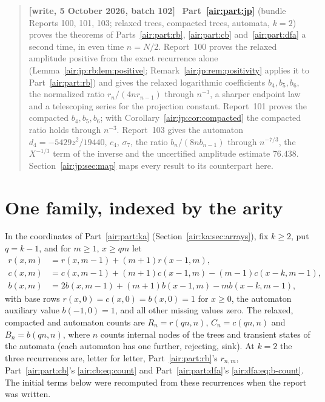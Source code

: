 \documentclass[11pt,letterpaper]{article}
\numberwithin{equation}{section}
\theoremstyle{remark}
\newenvironment{writenotejp}{\par\smallskip\begin{quote}\small\textbf{[write, 5 October 2026, batch 102]}\ }{\end{quote}\smallskip}
\begin{document}
\begin{writenotejp}
\textbf{Part~\ref{air:part:jp}} (bundle Reports 100, 101, 103; relaxed trees, compacted trees, automata, $k=2$) proves the theorems of Parts~\ref{air:part:rb}, \ref{air:part:cb} and~\ref{air:part:dfa} a second time, in even time $n=N/2$. Report~100 proves the relaxed amplitude positive from the exact recurrence alone (Lemma~\ref{air:jp:rb:lem:positive}; Remark~\ref{air:jp:rem:positivity} applies it to Part~\ref{air:part:rb}) and gives the relaxed logarithmic coefficients $b_4,b_5,b_6$, the normalized ratio $r_n/(4nr_{n-1})$ through $n^{-3}$, a sharper endpoint law and a telescoping series for the projection constant. Report~101 proves the compacted $b_4,b_5,b_6$; with Corollary~\ref{air:jp:cor:compacted} the compacted ratio holds through $n^{-3}$. Report~103 gives the automaton $d_4=-5429z^2/19440$, $c_4$, $\sigma_7$, the ratio $b_n/(8nb_{n-1})$ through $n^{-7/3}$, the $X^{-1/3}$ term of the inverse and the uncertified amplitude estimate $76.438$. Section~\ref{air:jp:sec:map} maps every result to its counterpart here.
\end{writenotejp}

\section*{One family, indexed by the arity}
\label{air:guide:family}
In the coordinates of Part~\ref{air:part:ka} (Section~\ref{air:ka:sec:arrays}), fix $k\ge2$, put $q=k-1$, and for $m\ge1$, $x\ge qm$ let
\begin{align*}
r(x,m)&=r(x,m-1)+(m+1)r(x-1,m),\\
c(x,m)&=c(x,m-1)+(m+1)c(x-1,m)-(m-1)c(x-k,m-1),\\
b(x,m)&=2b(x,m-1)+(m+1)b(x-1,m)-mb(x-k,m-1),
\end{align*}
with base rows $r(x,0)=c(x,0)=b(x,0)=1$ for $x\ge0$, the automaton auxiliary value $b(-1,0)=1$, and all other missing values zero. The relaxed, compacted and automaton counts are $R_n=r(qn,n)$, $C_n=c(qn,n)$ and $B_n=b(qn,n)$, where $n$ counts internal nodes of the trees and transient states of the automata (each automaton has one further, rejecting, sink). At $k=2$ the three recurrences are, letter for letter, Part~\ref{air:part:rb}'s $r_{n,m}$, Part~\ref{air:part:cb}'s \eqref{air:cb:eq:count} and Part~\ref{air:part:dfa}'s \eqref{air:dfa:eq:b-count}. The initial terms below were recomputed from these recurrences when the report was written.
\end{document}
